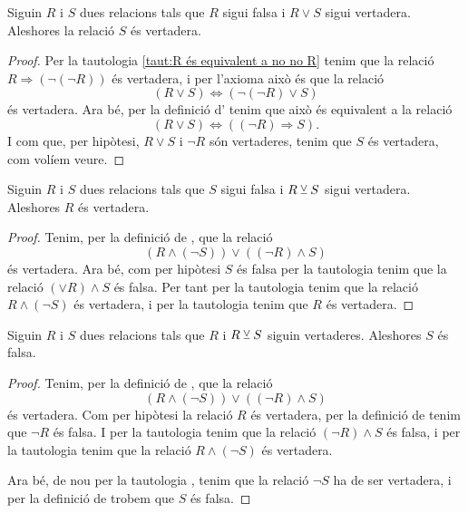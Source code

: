 \documentclass[../Apunts.tex]{subfiles}
\begin{document}
	\begin{tautology}
		\label{taut:condicions per disjunció}
		Siguin \(R\) i \(S\) dues relacions tals que \(R\) sigui falsa i \(R\lor S\) sigui vertadera. Aleshores la relació \(S\) és vertadera.
		\begin{proof}
			Per la tautologia \ref{taut:R és equivalent a no no R} tenim que la relació \(R\Rightarrow(\lnot(\lnot R))\) és vertadera, i per l'axioma  això és que la relació
			\[(R\lor S)\Leftrightarrow(\lnot(\lnot R)\lor S)\]
			és vertadera. Ara bé, per la definició d' tenim que això és equivalent a la relació
			\[(R\lor S)\Leftrightarrow((\lnot R)\Rightarrow S).\]
			I com que, per hipòtesi, \(R\lor S\) i \(\lnot R\) són vertaderes, tenim que \(S\) és vertadera, com volíem veure.
		\end{proof}
	\end{tautology}
	\begin{tautology}
		\label{taut:disjunció excloent 1}
		Siguin \(R\) i \(S\) dues relacions tals que \(S\) sigui falsa i \(R\veebar S\) sigui vertadera. Aleshores \(R\) és vertadera.
		\begin{proof}
			Tenim, per la definició de , que la relació
			\[(R\land(\lnot S))\lor((\lnot R)\land S)\]
			és vertadera. Ara bé, com per hipòtesi \(S\) és falsa per la tautologia  tenim que la relació \((\lor R)\land S\) és falsa. Per tant per la tautologia  tenim que la relació \(R\land(\lnot S)\) és vertadera, i per la tautologia  tenim que \(R\) és vertadera.
		\end{proof}
	\end{tautology}
	\begin{tautology}
		\label{taut:disjunció excloent 2}
		Siguin \(R\) i \(S\) dues relacions tals que \(R\) i \(R\veebar S\) siguin vertaderes. Aleshores \(S\) és falsa.
		\begin{proof}
			Tenim, per la definició de , que la relació
			\[(R\land(\lnot S))\lor((\lnot R)\land S)\]
			és vertadera. Com per hipòtesi la relació \(R\) és vertadera, per la definició de  tenim que \(\lnot R\) és falsa. I per la tautologia  tenim que la relació \((\lnot R)\land S\) és falsa, i per la tautologia  tenim que la relació \(R\land(\lnot S)\) és vertadera.
			
			Ara bé, de nou per la tautologia , tenim que la relació \(\lnot S\) ha de ser vertadera, i per la definició de  trobem que \(S\) és falsa.
		\end{proof}
	\end{tautology}
\end{document}
